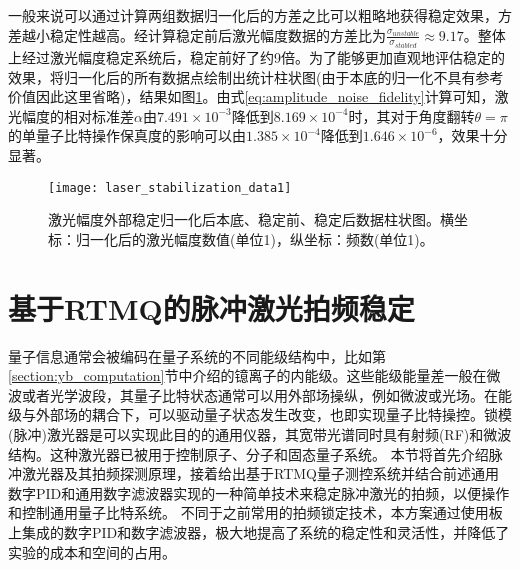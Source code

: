 一般来说可以通过计算两组数据归一化后的方差之比可以粗略地获得稳定效果，方差越小稳定性越高。经计算稳定前后激光幅度数据的方差比为$\frac{\sigma_{unstable}}{\sigma_{stabled}}\approx 9.17$。整体上经过激光幅度稳定系统后，稳定前好了约9倍。为了能够更加直观地评估稳定的效果，将归一化后的所有数据点绘制出统计柱状图(由于本底的归一化不具有参考价值因此这里省略)，结果如图\ref{fig:laser_stabilization_data1}。由式\eqref{eq:amplitude_noise_fidelity}计算可知，激光幅度的相对标准差$\alpha$由$7.491\times 10^{-3}$降低到$8.169\times 10^{-4}$时，其对于角度翻转$\theta=\pi$的单量子比特操作保真度的影响可以由$1.385\times 10^{-4}$降低到$1.646\times 10^{-6}$，效果十分显著。


\begin{figure}
    \centering
    \texttt{[image: laser\_stabilization\_data1]}
    \caption[激光幅度外部稳定柱状图对比数据]{激光幅度外部稳定归一化后本底、稳定前、稳定后数据柱状图。横坐标：归一化后的激光幅度数值(单位1)，纵坐标：频数(单位1)。\label{fig:laser_stabilization_data1}}
\end{figure}










\newpage
\section[基于RTMQ的脉冲激光拍频稳定]{基于RTMQ的脉冲激光拍频稳定\label{section:pulsed_laser_locking}}

量子信息通常会被编码在量子系统的不同能级结构中，比如第\ref{section:yb_computation}节中介绍的镱离子的内能级。这些能级能量差一般在微波或者光学波段，其量子比特状态通常可以用外部场操纵，例如微波或光场。在能级与外部场的耦合下，可以驱动量子状态发生改变，也即实现量子比特操控。锁模(脉冲)激光器是可以实现此目的的通用仪器，其宽带光谱同时具有射频(RF)和微波结构。这种激光器已被用于控制原子\cite[]{Hayes_Matsukevich_Maunz_Hucul_Quraishi_Olmschenk_Campbell_Mizrahi_Senko_Monroe_2010}、分子\cite[]{Peer_Shapiro_Stowe_Shapiro_Ye_2007}和固态量子系统\cite[]{Greve_Press_McMahon_Yamamoto_2013}。
本节将首先介绍脉冲激光器及其拍频探测原理，接着给出基于RTMQ量子测控系统并结合前述通用数字PID和通用数字滤波器实现的一种简单技术来稳定脉冲激光的拍频，以便操作和控制通用量子比特系统\cite[]{ladd2010quantum}。
不同于之前常用的拍频锁定技术\cite[]{Islam_Campbell_Choi_Clark_Conover_Debnath_Edwards_Fields_Hayes_Hucul_et_al_2014}，本方案通过使用板上集成的数字PID和数字滤波器，极大地提高了系统的稳定性和灵活性，并降低了实验的成本和空间的占用。


